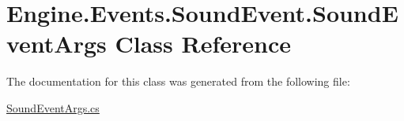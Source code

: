 \hypertarget{a00390}{}\section{Engine.\+Events.\+Sound\+Event.\+Sound\+Event\+Args Class Reference}
\label{a00390}


The documentation for this class was generated from the following file\+:\begin{DoxyCompactItemize}
\item 
\hyperlink{a00074}{Sound\+Event\+Args.\+cs}\end{DoxyCompactItemize}
